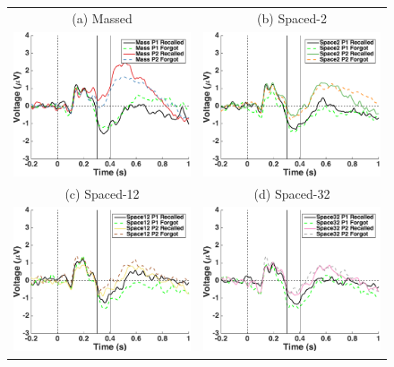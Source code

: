 \begin{figure}[hp]
  \centering
  \begin{tabular}{cc}
  \multicolumn{1}{c}{(a) Massed} & \multicolumn{1}{c}{(b) Spaced-2} \\
  \includegraphics[width=.35\textwidth]{./figs/exp2/tla_single_ga_word_rc_mass_p1_word_fo_mass_p1_word_rc_mass_p2_word_fo_mass_p2_C_-200_1000_legend_xylabel} &
  \includegraphics[width=.35\textwidth]{./figs/exp2/tla_single_ga_word_rc_spac2_p1_word_fo_spac2_p1_word_rc_spac2_p2_word_fo_spac2_p2_C_-200_1000_legend_xylabel} \\
  \multicolumn{1}{c}{(c) Spaced-12} & \multicolumn{1}{c}{(d) Spaced-32} \\
  \includegraphics[width=.35\textwidth]{./figs/exp2/tla_single_ga_word_rc_spac12_p1_word_fo_spac12_p1_word_rc_spac12_p2_word_fo_spac12_p2_C_-200_1000_legend_xylabel} &
  \includegraphics[width=.35\textwidth]{./figs/exp2/tla_single_ga_word_rc_spac32_p1_word_fo_spac32_p1_word_rc_spac32_p2_word_fo_spac32_p2_C_-200_1000_legend_xylabel} \\

\end{tabular}
\end{figure}
